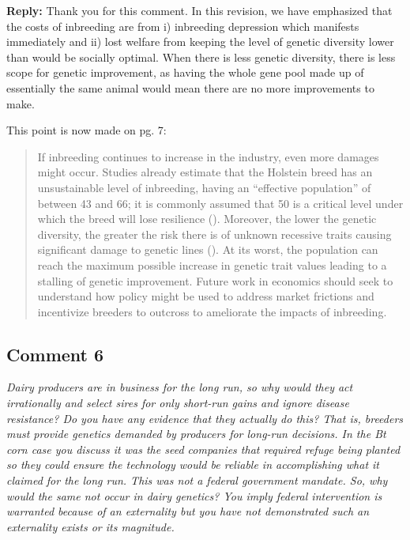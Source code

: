 \documentclass[12pt,letterpaper]{article}
\begin{document}
\textbf{Reply:} Thank you for this comment. In this revision, we have emphasized that the costs of inbreeding are from i) inbreeding depression which manifests immediately and ii) lost welfare from keeping the level of genetic diversity lower than would be socially optimal. When there is less genetic diversity, there is less scope for genetic improvement, as having the whole gene pool made up of essentially the same animal would mean there are no more improvements to make.


 This point is now made on pg. 7:

\begin{quote}
If inbreeding continues to increase in the industry, even more damages might occur.
Studies already estimate that the Holstein breed has an unsustainable level of inbreeding, having an ``effective population'' of between 43 and 66; it is commonly assumed that 50 is a critical level under which the breed will lose resilience (\cite{Makanjuola2020}).
Moreover, the lower the genetic diversity, the greater the risk there is of unknown recessive traits causing significant damage to genetic lines (\cite{Cole2011, Lozada2024}). 
At its worst, the population can reach the maximum possible increase in genetic trait values leading to a stalling of genetic improvement.
Future work in economics should seek to understand how policy might be used to address market frictions and incentivize breeders to outcross to ameliorate the impacts of inbreeding.
\end{quote}
 
\subsection*{Comment 6}
{\it Dairy producers are in business for the long run, so why would they act irrationally and select sires for only short-run gains and ignore disease resistance? Do you have any evidence that they actually do this? That is, breeders must provide genetics demanded by producers for long-run decisions. In the Bt corn case you discuss it was the seed companies that required refuge being planted so they could ensure the technology would be reliable in accomplishing what it claimed for the long run. This was not a federal government mandate. So, why would the same not occur in dairy genetics? You imply federal intervention is warranted because of an externality but you have not demonstrated such an externality exists or its magnitude. } \\
\end{document}
